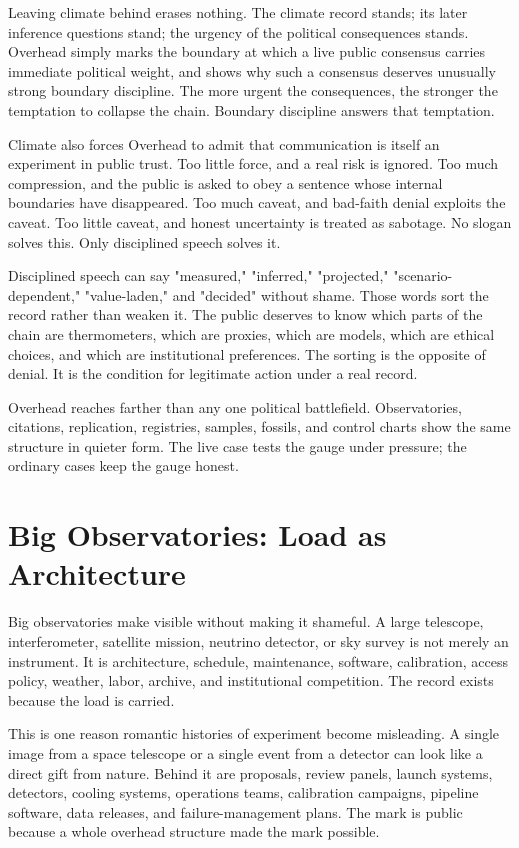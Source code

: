 Leaving climate behind erases nothing. The climate record stands; its later
inference questions stand; the urgency of the political consequences stands.
Overhead simply marks the boundary at which a live public consensus carries
immediate political weight, and shows why such a consensus deserves unusually
strong boundary discipline. The more urgent the consequences, the stronger
the temptation to collapse the chain. Boundary discipline answers that
temptation.

Climate also forces Overhead to admit that communication is itself an
experiment in public trust. Too little force, and a real risk is ignored. Too
much compression, and the public is asked to obey a sentence whose internal
boundaries have disappeared. Too much caveat, and bad-faith denial exploits
the caveat. Too little caveat, and honest uncertainty is treated as sabotage.
No slogan solves this. Only disciplined speech solves it.

Disciplined speech can say "measured," "inferred," "projected,"
"scenario-dependent," "value-laden," and "decided" without shame. Those words
sort the record rather than weaken it. The public deserves to know which
parts of the chain are thermometers, which are proxies, which are models,
which are ethical choices, and which are institutional preferences. The
sorting is the opposite of denial. It is the condition for legitimate action
under a real record.

Overhead reaches farther than any one political battlefield. Observatories,
citations, replication, registries, samples, fossils, and control charts
show the same structure in quieter form. The live case tests the gauge under
pressure; the ordinary cases keep the gauge honest.

\section{Big Observatories: Load as Architecture}

Big observatories make  visible without making it shameful. A
large telescope, interferometer, satellite mission, neutrino detector, or sky
survey is not merely an instrument. It is architecture, schedule, maintenance,
software, calibration, access policy, weather, labor, archive, and institutional
competition. The record exists because the load is carried.

This is one reason romantic histories of experiment become misleading. A
single image from a space telescope or a single event from a detector can look
like a direct gift from nature. Behind it are proposals, review panels, launch
systems, detectors, cooling systems, operations teams, calibration campaigns,
pipeline software, data releases, and failure-management plans. The mark is
public because a whole overhead structure made the mark possible.

